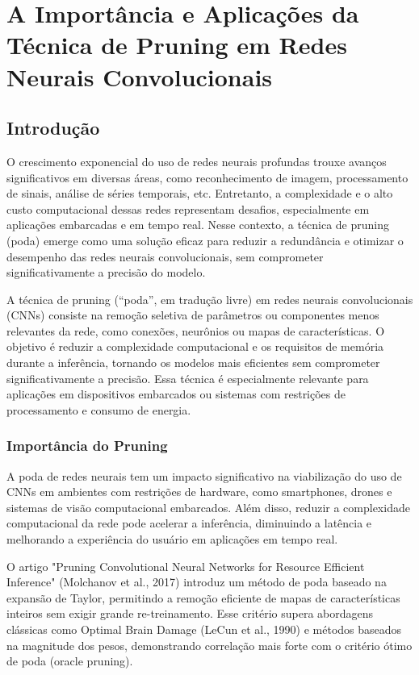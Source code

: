 \chapter{A Importância e Aplicações da Técnica de Pruning em Redes Neurais Convolucionais}

\section{Introdução}

O crescimento exponencial do uso de redes neurais profundas trouxe avanços significativos em diversas áreas, como reconhecimento de imagem, processamento de sinais, análise de séries temporais, etc. Entretanto, a complexidade e o alto custo computacional dessas redes representam desafios, especialmente em aplicações embarcadas e em tempo real. Nesse contexto, a técnica de pruning (poda) emerge como uma solução eficaz para reduzir a redundância e otimizar o desempenho das redes neurais convolucionais, sem comprometer significativamente a precisão do modelo.

A técnica de pruning (“poda”, em tradução livre) em redes neurais convolucionais (CNNs) consiste na remoção seletiva de parâmetros ou componentes menos relevantes da rede, como conexões, neurônios ou mapas de características. O objetivo é reduzir a complexidade computacional e os requisitos de memória durante a inferência, tornando os modelos mais eficientes sem comprometer significativamente a precisão. Essa técnica é especialmente relevante para aplicações em dispositivos embarcados ou sistemas com restrições de processamento e consumo de energia.

\subsection{Importância do Pruning}

A poda de redes neurais tem um impacto significativo na viabilização do uso de CNNs em ambientes com restrições de hardware, como smartphones, drones e sistemas de visão computacional embarcados. Além disso, reduzir a complexidade computacional da rede pode acelerar a inferência, diminuindo a latência e melhorando a experiência do usuário em aplicações em tempo real.

O artigo "Pruning Convolutional Neural Networks for Resource Efficient Inference" (Molchanov et al., 2017) introduz um método de poda baseado na expansão de Taylor, permitindo a remoção eficiente de mapas de características inteiros sem exigir grande re-treinamento. Esse critério supera abordagens clássicas como Optimal Brain Damage (LeCun et al., 1990) e métodos baseados na magnitude dos pesos, demonstrando correlação mais forte com o critério ótimo de poda (oracle pruning).

